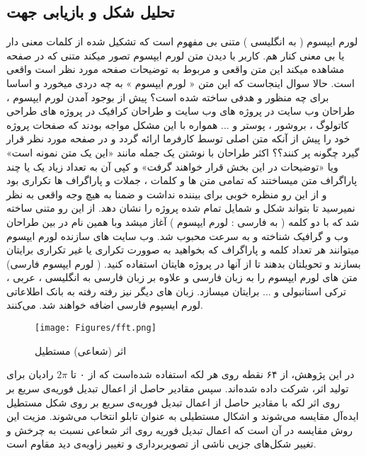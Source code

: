 \documentclass[oneside,openany,msc]{SBU-Thesis}
\begin{document}
	\subsection{تحلیل شکل و بازیابی جهت}
	
	لورم ایپسوم ( به انگلیسی  ) متنی بی مفهوم است که تشکیل شده از کلمات معنی دار یا بی معنی کنار هم. کاربر با دیدن متن لورم ایپسوم تصور میکند متنی که در صفحه مشاهده میکند این متن واقعی و مربوط به توضیحات صفحه مورد نظر است واقعی است. حالا سوال اینجاست که این متن « لورم ایپسوم » به چه دردی میخورد و اساسا برای چه منظور و هدفی ساخته شده است؟ پیش از بوجود آمدن لورم ایپسوم ، طراحان وب سایت در پروژه های وب سایت و طراحان کرافیک در پروژه های طراحی کاتولوگ ، بروشور ، پوستر و ... همواره با این مشکل مواجه بودند که صفحات پروژه خود را پیش از آنکه متن اصلی توسط کارفرما ارائه گردد و در صفحه مورد نظر قرار گیرد چگونه پر کنند؟؟ اکثر طراحان با نوشتن یک جمله مانند «این یک متن نمونه است» ویا «توضیحات در این بخش قرار خواهند گرفت» و کپی آن به تعداد زیاد یک یا چند پاراگراف متن میساختند که تمامی متن ها و کلمات ، جملات و پاراگراف ها تکراری بود و از این رو منظره خوبی برای بیننده نداشت و ضمنا به هیچ وجه واقعی به نظر نمیرسید تا بتواند شکل و شمایل تمام شده پروژه را نشان دهد. از این رو متنی ساخته شد که با دو کلمه ( به فارسی : لورم ایپسوم ) آغاز میشد وبا همین نام در بین طراحان وب و گرافیک شناخته و به سرعت محبوب شد. وب سایت های سازنده لورم ایپسوم میتوانند هر تعداد کلمه و پاراگراف که بخواهید به صوورت تکراری یا غیر تکراری برایتان بسازند و تحویلتان بدهند تا از آنها در پروژه هایتان استفاده کنید. ( لورم ایپسوم فارسی) متن های لورم ایپسوم را به زبان فارسی و علاوه بر زبان فارسی به انگلیسی ، عربی ، ترکی استانبولی و ... برایتان میسازد. زبان های دیگر نیز رفته رفته به بانک اطلاعاتی لورم ایسپوم فارسی اضافه خواهند شد.  
	می‌کنند. 
	\begin{figure}[t]
		\centering
		\texttt{[image: Figures/fft.png]}
		\caption[اثر (شعاعی) مستطیل]{اثر (شعاعی) مستطیل \cite{reina2006adaptive}}
		\label{fig:fft}
	\end{figure}
	در این پژوهش، از ۶۴ نقطه روی هر لکه استفاده شده‌است که از ۰ تا $2\pi$ رادیان برای تولید اثر، شرکت داده شده‌اند. سپس مقادیر حاصل از اعمال تبدیل فوریه‌ی سریع بر روی اثر لکه با مقادیر حاصل از اعمال تبدیل فوریه‌ی سریع بر روی شکل مستطیل ایده‌آل مقایسه می‌شوند و اشکال مستطیلی به عنوان تابلو انتخاب می‌شوند. مزیت این روش مقایسه در آن است که اعمال تبدیل فوریه روی اثر شعاعی نسبت به چرخش و تغییر شکل‌های جزیی ناشی از تصویربرداری و تغییر زاویه‌ی دید مقاوم است. 
\end{document}
